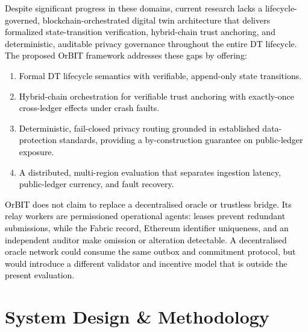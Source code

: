 \documentclass[final,5p,times,twocolumn]{elsarticle}
\begin{document}
\textcolor{black}{Despite significant progress in these domains, current research lacks a lifecycle-governed,
blockchain-orchestrated digital twin architecture that delivers formalized state-transition
verification, hybrid-chain trust anchoring, and deterministic, auditable privacy governance
throughout the entire DT lifecycle. The proposed OrBIT framework addresses these gaps by
offering:}
\begin{enumerate}
    \item \textcolor{black}{Formal DT lifecycle semantics with verifiable, append-only state transitions.}
    \item \textcolor{black}{Hybrid-chain orchestration for verifiable trust anchoring with exactly-once cross-ledger effects under crash faults.}
    \item \textcolor{black}{Deterministic, fail-closed privacy routing grounded in established data-protection standards, providing a by-construction guarantee on public-ledger exposure.}
    \item \textcolor{black}{A distributed, multi-region evaluation that separates ingestion latency, public-ledger currency, and fault recovery.}
\end{enumerate}
\textcolor{black}{OrBIT does not claim to replace a decentralised oracle or trustless bridge. Its relay workers are permissioned operational agents: leases prevent redundant submissions, while the Fabric record, Ethereum identifier uniqueness, and an independent auditor make omission or alteration detectable. A decentralised oracle network could consume the same outbox and commitment protocol, but would introduce a different validator and incentive model that is outside the present evaluation.}


%

\section{\textbf{System Design \& Methodology}}
\label{sec:system_design}
\end{document}
